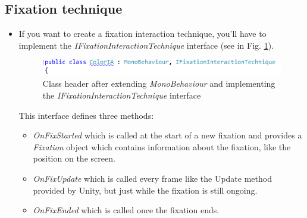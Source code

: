 \documentclass[../../Instructions_Framework]{subfiles}
\begin{document}
\subsection{Fixation technique}
\begin{itemize}
	\item If you want to create a fixation interaction technique, you'll have to implement the \textit{IFixationInteractionTechnique} interface (see in Fig. \ref{classHeader}).\\
	\begin{figure}
		\centering
		\includegraphics[width=0.7\linewidth]{img/InterfaceFix}
		\caption{Class header after extending \textit{MonoBehaviour} and implementing the \textit{IFixationInteractionTechnique} interface}
		\label{classHeader}
	\end{figure}
	This interface defines three methods:
	\begin{itemize}
		\item \textit{OnFixStarted} which is called at the start of a new fixation and provides a \textit{Fixation} object which contains information about the fixation, like the position on the screen.
		\item \textit{OnFixUpdate} which is called every frame like the Update method provided by Unity, but just while the fixation is still ongoing.
		\item \textit{OnFixEnded} which is called once the fixation ends.
	\end{itemize}

\end{itemize}
\end{document}
